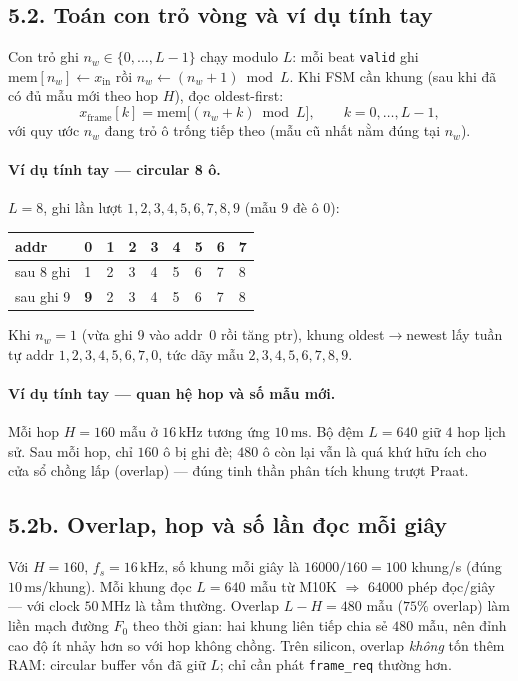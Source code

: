 \subsection*{5.2. Toán con trỏ vòng và ví dụ tính tay}

Con trỏ ghi $n_w\in\{0,\ldots,L-1\}$ chạy modulo $L$: mỗi beat \texttt{valid} ghi $\mathrm{mem}[n_w]\leftarrow x_{\mathrm{in}}$ rồi $n_w\leftarrow(n_w+1)\bmod L$. Khi FSM cần khung (sau khi đã có đủ mẫu mới theo hop $H$), đọc oldest-first:
\[
x_{\mathrm{frame}}[k]=\mathrm{mem}\bigl[(n_w+k)\bmod L\bigr],\qquad k=0,\ldots,L-1,
\]
với quy ước $n_w$ đang trỏ ô trống tiếp theo (mẫu cũ nhất nằm đúng tại $n_w$).

\paragraph{Ví dụ tính tay --- circular 8 ô.} $L=8$, ghi lần lượt $1,2,3,4,5,6,7,8,9$ (mẫu 9 đè ô 0):
\begin{center}\small
\begin{tabular}{@{}lllllllll@{}}
\toprule
addr & 0 & 1 & 2 & 3 & 4 & 5 & 6 & 7 \\
\midrule
sau 8 ghi & 1 & 2 & 3 & 4 & 5 & 6 & 7 & 8 \\
sau ghi 9 & \textbf{9} & 2 & 3 & 4 & 5 & 6 & 7 & 8 \\
\bottomrule
\end{tabular}
\end{center}
Khi $n_w=1$ (vừa ghi 9 vào addr~0 rồi tăng ptr), khung oldest$\to$newest lấy tuần tự addr $1{,}2{,}3{,}4{,}5{,}6{,}7{,}0$, tức dãy mẫu $2{,}3{,}4{,}5{,}6{,}7{,}8{,}9$.

\paragraph{Ví dụ tính tay --- quan hệ hop và số mẫu mới.} Mỗi hop $H=160$ mẫu ở $16\,\text{kHz}$ tương ứng $10\,\text{ms}$. Bộ đệm $L=640$ giữ $4$ hop lịch sử. Sau mỗi hop, chỉ $160$ ô bị ghi đè; $480$ ô còn lại vẫn là quá khứ hữu ích cho cửa sổ chồng lấp (overlap) --- đúng tinh thần phân tích khung trượt Praat.


\subsection*{5.2b. Overlap, hop và số lần đọc mỗi giây}

Với $H=160$, $f_s=16\,\text{kHz}$, số khung mỗi giây là $16000/160=100$ khung/s (đúng $10\,\text{ms}$/khung). Mỗi khung đọc $L=640$ mẫu từ M10K $\Rightarrow$ $64000$ phép đọc/giây --- với clock $50\,\text{MHz}$ là tầm thường. Overlap $L-H=480$ mẫu ($75\%$ overlap) làm liền mạch đường $F_0$ theo thời gian: hai khung liên tiếp chia sẻ $480$ mẫu, nên đỉnh cao độ ít nhảy hơn so với hop không chồng. Trên silicon, overlap \emph{không} tốn thêm RAM: circular buffer vốn đã giữ $L$; chỉ cần phát \texttt{frame\_req} thường hơn.

